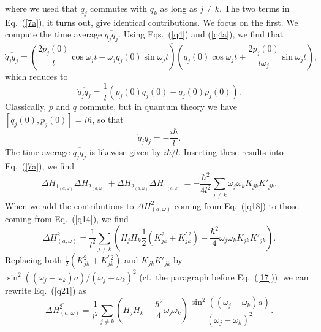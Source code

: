 \documentclass[12pt]{elsart}
\begin{document}
where we used that $q_j$ commutes with $\dot{q}_k$ as long as $j \neq k$. 
The two terms in Eq.\ (\ref{7a}), it turns out, give identical contributions. We focus on the first. We compute the time average $\overline{\dot{q}_j q_j}$. Using Eqs.\ (\ref{q4}) and (\ref{q4a}), we find that
$$
\overline{\dot{q}_j q_j} = \overline{\left(  \frac{2p_j(0)}{l}  \cos{ \omega_j t}  -  \omega_j q_j(0) \sin{ \omega_j t} \right) 
\left(  q_j(0) \cos{ \omega_j t}  +  \frac{2p_j(0)}{l \omega_j}  \sin{ \omega_j t} \right)},
$$
which reduces to
\begin{equation}
\overline{\dot{q}_j q_j} = \frac{1}{l} \left( p_j(0) q_j(0) - q_j(0) p_j(0)\right).
\label{q16}
\end{equation}
Classically, $p$ and $q$ commute, but in quantum theory we have $[q_j(0), p_j(0)] = i \hbar$, so that
\begin{equation}
\overline{\dot{q}_j q_j} = - \frac{i \hbar}{l}.
\label{q17}
\end{equation}
The time average $\overline{ q_j \dot{q}_j}$ is likewise given by $i \hbar/l$. Inserting these results into Eq.\ (\ref{7a}), we find
\begin{equation}
\overline{\Delta H_{1_{(a, \omega)}} \Delta H_{2_{(a, \omega)}}} + \overline{\Delta H_{2_{(a, \omega)}} \Delta H_{1_{(a, \omega)}}}
= - \frac{\hbar^2}{4l^2} \sum_{j \neq k} \omega_j \omega_k K_{jk} K'_{jk}.
\label{q18}
\end{equation}
When we add the contributions to $\overline{\Delta H_{(a, \omega)}^2}$ coming from Eq.\ (\ref{q18}) to those coming from Eq.\ (\ref{q14}), we find
\begin{equation}
\overline{\Delta H_{(a, \omega)}^2} =
\frac{1}{l^2}  \sum_{j \neq k} \left(  H_j H_k \frac{1}{2} \left( K^2_{jk} + K^{' \, 2}_{jk}\right) - 
\frac{\hbar^2}{4} \omega_j \omega_k K_{jk} K'_{jk} \right).
 \label{q21}
\end{equation}
Replacing both $ \frac{1}{2} \left( K^2_{jk} + K^{' \, 2}_{jk} \right)$ and $K_{jk} K'_{jk}$ by $\sin^2{((\omega_j - \omega_k)a)}/(\omega_j - \omega_k)^2$
(cf.\ the paragraph before Eq.\ (\ref{17})), we can rewrite Eq.\ (\ref{q21}) as 
\begin{equation}
\overline{\Delta H_{(a, \omega)}^2} =
\frac{1}{l^2}  \sum_{j \neq k} \left(  H_j H_k  - 
\frac{\hbar^2}{4} \omega_j \omega_k  \right)   \frac{\sin^2{((\omega_j - \omega_k)a)}}{(\omega_j - \omega_k)^2}.
 \label{q30}
 \end{equation}
\end{document}
